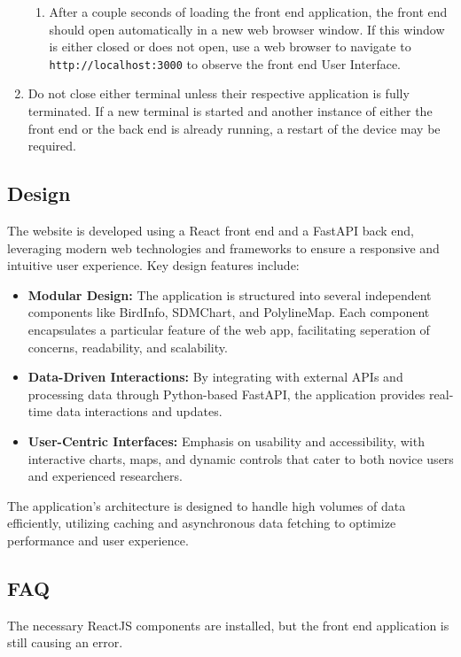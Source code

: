 \documentclass{article}
\begin{document}
\begin{enumerate}
\begin{enumerate}
        \item After a couple seconds of loading the front end application, the front end should open automatically in a new web browser window. If this window is either closed or does not open, use a web browser to navigate to \texttt{http://localhost:3000} to observe the front end User Interface.
    \end{enumerate}
    \item Do not close either terminal unless their respective application is fully terminated. If a new terminal is started and another instance of either the front end or the back end is already running, a restart of the device may be required.
\end{enumerate}

\subsection{Design}
The website is developed using a React front end and a FastAPI back end, leveraging modern web technologies and frameworks to ensure a responsive and intuitive user experience. Key design features include:

\begin{itemize}
    \item \textbf{Modular Design:} The application is structured into several independent components like BirdInfo, SDMChart, and PolylineMap. Each component encapsulates a particular feature of the web app, facilitating seperation of concerns, readability, and scalability.
    \item \textbf{Data-Driven Interactions:} By integrating with external APIs and processing data through Python-based FastAPI, the application provides real-time data interactions and updates.
    \item \textbf{User-Centric Interfaces:} Emphasis on usability and accessibility, with interactive charts, maps, and dynamic controls that cater to both novice users and experienced researchers.
\end{itemize}

The application's architecture is designed to handle high volumes of data efficiently, utilizing caching and asynchronous data fetching to optimize performance and user experience.

\subsection{FAQ}

The necessary ReactJS components are installed, but the front end application is still causing an error.
\end{document}
